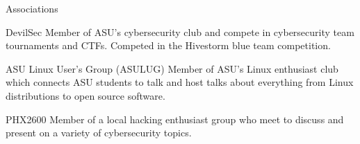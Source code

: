 \documentclass{article}
\newlength{\tabin}
\newlength{\secsep}
\newcommand{\lineunder}{\vspace*{-8pt} \\ \hspace*{-6pt} \hrulefill \\ \vspace*{-15pt}}
\newenvironment{tabbedsection}[1]{
  \begin{list}{}{
      \setlength{\itemsep}{0pt}
      \setlength{\labelsep}{0pt}
      \setlength{\labelwidth}{0pt}
      \setlength{\leftmargin}{\tabin}
      \setlength{\rightmargin}{\tabin}
      \setlength{\listparindent}{0pt}
      \setlength{\parsep}{0pt}
      \setlength{\parskip}{0pt}
      \setlength{\partopsep}{0pt}
      \setlength{\topsep}{#1}
    }
  \item[]
}{\end{list}}
\newenvironment{resume_section}[1]{
  \filbreak
  \vspace{2\secsep}
  \textsc{\large#1}
  \lineunder
  \begin{tabbedsection}{\secsep}
}{\end{tabbedsection}}
\newenvironment{resume_subsection}[2][]{
  \textbf{#2} \hfill {\normalsize #1} \hspace{-5em}
  \begin{tabbedsection}{0.5\secsep}
}{\end{tabbedsection}}
\begin{document}
\begin{resume_section}{Associations}
  	\begin{resume_subsection}{DevilSec}
		Member of ASU's cybersecurity club and compete in cybersecurity team tournaments and CTFs. Competed in the Hivestorm blue team competition.
  	\end{resume_subsection}
  	\vspace{2\secsep}
  	\begin{resume_subsection}{ASU Linux User's Group (ASULUG)}
  	Member of ASU's Linux enthusiast club which connects ASU students to talk and host talks about everything from Linux distributions to open source software.
  	\end{resume_subsection}
  	\vspace{2\secsep}
  	\begin{resume_subsection}{PHX2600}
  	Member of a local hacking enthusiast group who meet to discuss and present on a variety of cybersecurity topics.
  	\end{resume_subsection}
\end{resume_section}
\end{document}
